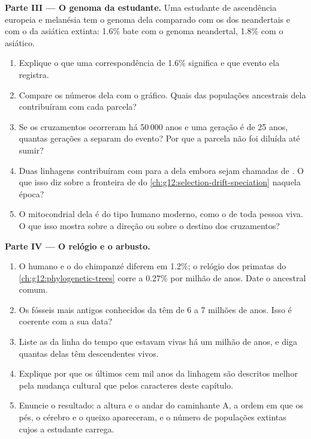 \begin{problem}
\medskip
\noindent\textbf{Parte III --- O genoma da estudante.}
Uma estudante de ascendência europeia e melanésia tem o genoma dela
comparado com os dos neandertais e com o da  asiática extinta:
1.6\% bate com o genoma neandertal, 1.8\% com o asiático.
\begin{enumerate}[resume]
  \item Explique o que uma correspondência de 1.6\% significa e que
        evento ela registra.
  \item Compare os números dela com o gráfico. Quais das populações
        ancestrais dela contribuíram com cada parcela?
  \item Se os cruzamentos ocorreram há 50\,000 anos e uma geração é de
        25 anos, quantas gerações a separam do evento? Por que a
        parcela não foi diluída até sumir?
  \item Duas linhagens contribuíram com  para a dela embora sejam
        chamadas de . O que isso diz sobre a fronteira de
         do \cref{ch:g12:selection-drift-speciation} naquela época?
  \item O  mitocondrial dela é do tipo humano moderno, como o de
        toda pessoa viva. O que isso mostra sobre a direção ou sobre o
        destino dos cruzamentos?
\end{enumerate}

\medskip
\noindent\textbf{Parte IV --- O relógio e o arbusto.}
\begin{enumerate}[resume]
  \item O  humano e o do chimpanzé diferem em 1.2\%; o relógio dos
        primatas do \cref{ch:g12:phylogenetic-trees} corre a 0.27\% por
        milhão de anos. Date o ancestral comum.
  \item Os fósseis mais antigos conhecidos da  têm de 6
        a 7 milhões de anos. Isso é coerente com a sua data?
  \item Liste as  da linha do tempo que estavam vivas há um
        milhão de anos, e diga quantas delas têm descendentes vivos.
  \item Explique por que os últimos cem mil anos da linhagem são
        descritos melhor pela mudança cultural que pelos caracteres
        deste capítulo.
  \item Enuncie o resultado: a altura e o andar do caminhante A, a
        ordem em que os pés, o cérebro e o queixo apareceram, e o
        número de populações extintas cujos  a estudante carrega.
\end{enumerate}
\end{problem}
